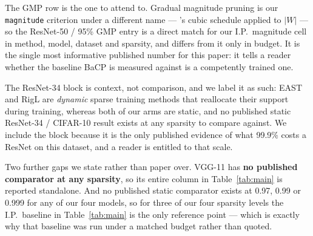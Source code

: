 The GMP row is the one to attend to. Gradual magnitude pruning is our
\texttt{magnitude} criterion under a different name --- \citet{zhu2018prune}'s
cubic schedule applied to $|W|$ --- so the ResNet-50 / 95\% GMP entry is a direct
match for our I.P.\ magnitude cell in method, model, dataset and sparsity, and
differs from it only in budget. It is the single most informative published number
for this paper: it tells a reader whether the baseline BaCP is measured against is
a competently trained one.

The ResNet-34 block is context, not comparison, and we label it as such: EAST and
RigL are \emph{dynamic} sparse training methods that reallocate their support
during training, whereas both of our arms are static, and no published static
ResNet-34 / CIFAR-10 result exists at any sparsity to compare against. We include
the block because it is the only published evidence of what 99.9\% costs a ResNet
on this dataset, and a reader is entitled to that scale.

Two further gaps we state rather than paper over. VGG-11 has \textbf{no published
comparator at any sparsity}, so its entire column in Table~\ref{tab:main} is
reported standalone. And no published static comparator exists at 0.97, 0.99 or
0.999 for any of our four models, so for three of our four sparsity levels the
I.P.\ baseline in Table~\ref{tab:main} is the only reference point --- which is
exactly why that baseline was run under a matched budget rather than quoted.
